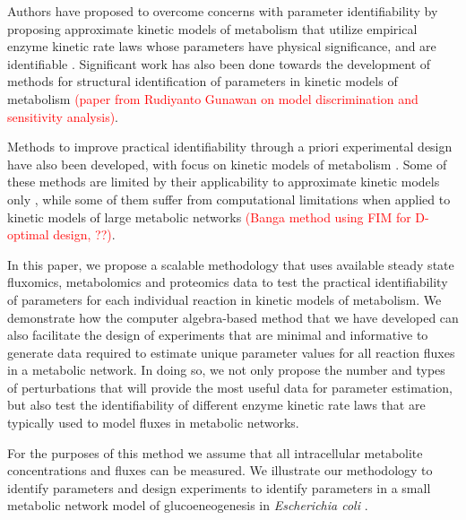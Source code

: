 \documentclass[10pt]{article}
\begin{document}
	Authors have proposed to overcome concerns with parameter identifiability by proposing approximate kinetic models of metabolism that utilize empirical enzyme kinetic rate laws whose parameters have physical significance, and are identifiable \parencite{Heijnen2005,Smallbone2007}. Significant work has also been done towards the development of methods for structural identification of parameters in kinetic models of metabolism \parencite{Ljung1994,Nikerel2009,Berthoumieux2013,Raue2014}\textcolor{red}{(paper from Rudiyanto Gunawan on model discrimination and sensitivity analysis)}.	
	
	Methods to improve practical identifiability through a priori experimental design have also been developed, with focus on kinetic models of metabolism \parencite{Gadkar2005a,Vanlier2014a,Raue2014}. Some of these methods are limited by their applicability to approximate kinetic models only \parencite{Nikerel2009,Berthoumieux2013}, while some of them suffer from computational limitations when applied to kinetic models of large metabolic networks \parencite{Gadkar2005a,Raue2014}\textcolor{red}{(Banga method using FIM for D-optimal design, ??)}. 	
	
	In this paper, we propose a scalable methodology that uses available steady state fluxomics, metabolomics and proteomics data to test the practical identifiability of parameters for each individual reaction in kinetic models of metabolism. We demonstrate how the computer algebra-based method that we have developed can also facilitate the design of experiments that are minimal and informative to generate data required to estimate unique parameter values for all reaction fluxes in a metabolic network. In doing so, we not only propose the number and types of perturbations that will provide the most useful data for parameter estimation, but also test the identifiability of different enzyme kinetic rate laws that are typically used to model fluxes in metabolic networks. 
	
	For the purposes of this method we assume that all intracellular metabolite concentrations and fluxes can be measured. We illustrate our methodology to identify parameters and design experiments to identify parameters in a small metabolic network model of glucoeneogenesis in \textit{Escherichia coli} \parencite{Kotte2014, Srinivasan2017}.
	
	
 
\end{document}
